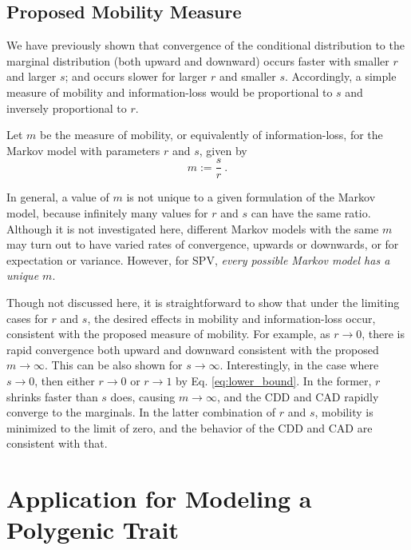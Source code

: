 \documentclass{svproc} %
\begin{document}
\subsection{Proposed Mobility Measure}
We have previously shown that convergence of the conditional distribution to the marginal distribution (both upward and downward) occurs faster with smaller $r$ and larger $s$; and occurs slower for larger $r$ and smaller $s$. Accordingly, a simple measure of mobility and information-loss would be proportional to $s$ and inversely proportional to $r$. 

\begin{definition}
Let $m$ be the measure of mobility, or equivalently of information-loss, for the Markov model with parameters $r$ and $s$, given by
\begin{equation}
m := \frac{s}{r} \ .
\end{equation}
\label{def:m}
\end{definition}

In general, a value of $m$ is not unique to a given formulation of the Markov model, because infinitely many values for $r$ and $s$ can have the same ratio. Although it is not investigated here, different Markov models with the same $m$ may turn out to have varied rates of convergence, upwards or downwards, or for expectation or variance. However, for SPV, \emph{every possible Markov model has a unique $m$}. 

Though not discussed here, it is straightforward to show that under the limiting cases for $r$ and $s$, the desired effects in mobility and information-loss occur, consistent with the proposed measure of mobility. For example, as $r \rightarrow 0$, there is rapid convergence both upward and downward consistent with the proposed $m \rightarrow \infty$. This can be also shown for  $s \rightarrow \infty$. Interestingly, in the case where $s \rightarrow 0$, then either $r \rightarrow 0$ or $r \rightarrow 1$ by Eq. \ref{eq:lower_bound}. In the former, $r$ shrinks faster than $s$ does, causing $m \rightarrow \infty$, and the CDD and CAD rapidly converge to the marginals. In the latter combination of $r$ and $s$, mobility is minimized to the limit of zero, and the behavior of the CDD and CAD are consistent with that. 



\section{Application for Modeling a Polygenic Trait}
\end{document}

